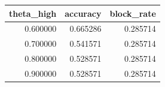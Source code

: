 \begin{tabular}{rrr}
\toprule
theta\_high & accuracy & block\_rate \\
\midrule
0.600000 & 0.665286 & 0.285714 \\
0.700000 & 0.541571 & 0.285714 \\
0.800000 & 0.528571 & 0.285714 \\
0.900000 & 0.528571 & 0.285714 \\
\bottomrule
\end{tabular}
